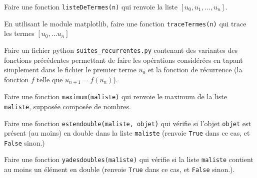 \begin{enonce}
\ssques Faire une fonction \texttt{listeDeTermes(n)} qui renvoie la liste $[u_0,u_1,\dots,u_n]$.

\ssques En utilisant le module matplotlib, faire une fonction \texttt{traceTermes(n)} qui trace les termes $[u_0,\dots u_n]$

\ssques Faire un fichier python \texttt{suites\_recurrentes.py} contenant des variantes des fonctions précédentes permettant de faire les opérations considérées en tapant simplement dans le fichier le premier terme $u_0$ et  la fonction de récurrence (\cad la fonction $f$ telle que $u_{n+1}=f(u_n)$).

\ques \label{maximum}Faire une fonction \texttt{maximum(maliste)} qui renvoie le maximum de la  liste \texttt{maliste}, supposée composée de nombres.




\ques  Faire une fonction \texttt{estendouble(maliste, objet)} qui v\'{e}rifie si l'objet \texttt{objet} est pr\'{e}sent (au moins) en double dans la liste \texttt{maliste} (renvoie \texttt{True} dans ce cas, et \texttt{False} sinon.)

\ques  Faire une fonction \texttt{yadesdoubles(maliste)} qui v\'{e}rifie si la liste \texttt{maliste} contient au moins un élément en double (renvoie \texttt{True} dans ce cas, et \texttt{False} sinon.).






\end{enonce}

\begin{correction}

\end{correction}

